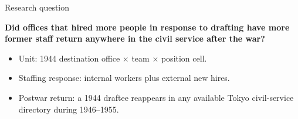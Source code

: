 \documentclass[aspectratio=169]{beamer}
\begin{document}
\begin{frame}{Research question}
  \vfill
  \begin{center}
    {\LARGE\bfseries
    Did offices that hired more people in response to drafting have more
    former staff return anywhere in the civil service after the war?}
  \end{center}
  \vfill
  \begin{itemize}
    \item Unit: 1944 destination office $\times$ team $\times$ position cell.
    \item Staffing response: internal workers plus external new hires.
    \item Postwar return: a 1944 draftee reappears in any available Tokyo
          civil-service directory during 1946--1955.
  \end{itemize}
  \vfill
\end{frame}
\end{document}
